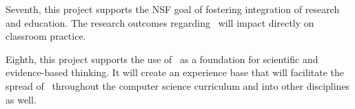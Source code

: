 Seventh, this project supports the NSF goal of fostering integration of
research and education.  The research outcomes regarding \eCT\ will impact
directly on classroom practice.

Eighth, this project supports the use of \eCT\ as a foundation for
scientific and evidence-based thinking. It will create an experience
base that will facilitate the spread of \eCT\ throughout the computer
science curriculum and into other disciplines as well. 








 











